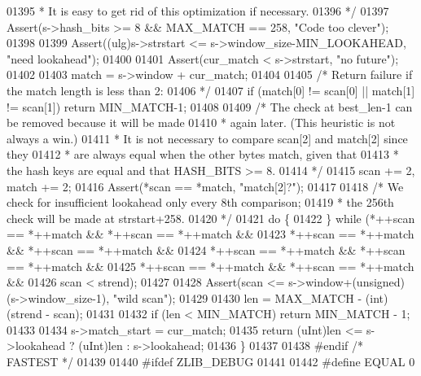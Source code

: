 \begin{DoxyCode}
{01395 \textcolor{comment}{     * It is easy to get rid of this optimization if necessary.}
01396 \textcolor{comment}{     */}
01397     Assert(s->hash\_bits >= 8 && MAX\_MATCH == 258, \textcolor{stringliteral}{"Code too clever"});
01398 
01399     Assert((ulg)s->strstart <= s->window\_size-MIN\_LOOKAHEAD, \textcolor{stringliteral}{"need lookahead"});
01400 
01401     Assert(cur\_match < s->strstart, \textcolor{stringliteral}{"no future"});
01402 
01403     match = s->window + cur\_match;
01404 
01405     \textcolor{comment}{/* Return failure if the match length is less than 2:}
01406 \textcolor{comment}{     */}
01407     \textcolor{keywordflow}{if} (match[0] != scan[0] || match[1] != scan[1]) \textcolor{keywordflow}{return} MIN\_MATCH-1;
01408 
01409     \textcolor{comment}{/* The check at best\_len-1 can be removed because it will be made}
01410 \textcolor{comment}{     * again later. (This heuristic is not always a win.)}
01411 \textcolor{comment}{     * It is not necessary to compare scan[2] and match[2] since they}
01412 \textcolor{comment}{     * are always equal when the other bytes match, given that}
01413 \textcolor{comment}{     * the hash keys are equal and that HASH\_BITS >= 8.}
01414 \textcolor{comment}{     */}
01415     scan += 2, match += 2;
01416     Assert(*scan == *match, \textcolor{stringliteral}{"match[2]?"});
01417 
01418     \textcolor{comment}{/* We check for insufficient lookahead only every 8th comparison;}
01419 \textcolor{comment}{     * the 256th check will be made at strstart+258.}
01420 \textcolor{comment}{     */}
01421     \textcolor{keywordflow}{do} \{
01422     \} \textcolor{keywordflow}{while} (*++scan == *++match && *++scan == *++match &&
01423              *++scan == *++match && *++scan == *++match &&
01424              *++scan == *++match && *++scan == *++match &&
01425              *++scan == *++match && *++scan == *++match &&
01426              scan < strend);
01427 
01428     Assert(scan <= s->window+(\textcolor{keywordtype}{unsigned})(s->window\_size-1), \textcolor{stringliteral}{"wild scan"});
01429 
01430     len = MAX\_MATCH - (int)(strend - scan);
01431 
01432     \textcolor{keywordflow}{if} (len < MIN\_MATCH) \textcolor{keywordflow}{return} MIN\_MATCH - 1;
01433 
01434     s->match\_start = cur\_match;
01435     \textcolor{keywordflow}{return} (uInt)len <= s->lookahead ? (uInt)len : s->lookahead;
01436 \}
01437 
01438 \textcolor{preprocessor}{#endif }\textcolor{comment}{/* FASTEST */}\textcolor{preprocessor}{}
01439 
01440 \textcolor{preprocessor}{#ifdef ZLIB\_DEBUG}
01441 
01442 \textcolor{preprocessor}{#define EQUAL 0}
}
\end{DoxyCode}
